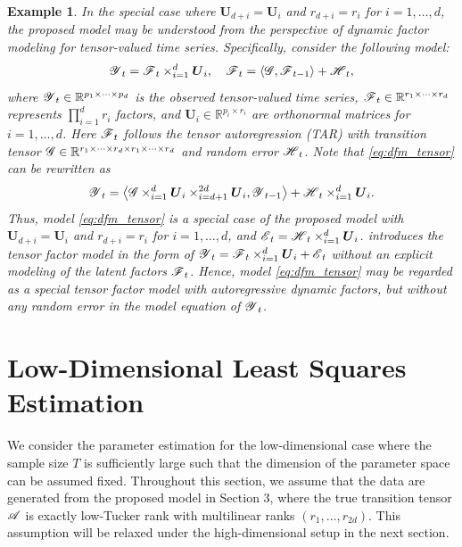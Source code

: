 \documentclass[12pt]{article}
\newtheorem{example}{Example}
\newcommand{\bm}{\boldsymbol}
\newcommand{\cm}[1]{\mbox{\boldmath$\mathscr{#1}$}}
\begin{document}
\begin{example}\label{ex2}
In the special case where $\bm{U}_{d+i}=\bm{U}_{i}$ and $r_{d+i}=r_i$ for $i=1,\dots, d$, the proposed model may be understood from the perspective of dynamic factor modeling \citep{SW11, BW16} for tensor-valued time series. Specifically, consider the following model:
\begin{equation}\label{eq:dfm_tensor}
\cm{Y}_t=\cm{F}_t\times_{i=1}^d\bm{U}_i, \quad \cm{F}_t=\langle\cm{G},\cm{F}_{t-1}\rangle+\cm{H}_t,
\end{equation}
where $\cm{Y}_t\in\mathbb{R}^{p_1\times\cdots\times p_d}$ is the observed tensor-valued time series,  $\cm{F}_t\in\mathbb{R}^{r_1\times\cdots\times r_d}$ represents $\prod_{i=1}^d r_i$ factors, and $\bm{U}_i\in\mathbb{R}^{p_i\times r_i}$ are orthonormal matrices for $i=1,\dots, d$. Here  $\cm{F}_t$ follows the tensor autoregression (TAR) with transition tensor $\cm{G}\in \mathbb{R}^{r_1\times\cdots\times r_d\times r_1\times\cdots\times r_d}$ and random error $\cm{H}_t$.
Note that \eqref{eq:dfm_tensor} can be rewritten as
\[
\cm{Y}_t =\left \langle\cm{G}\times_{i=1}^d\bm{U}_{i} \times_{i=d+1}^{2d}\bm{U}_{i},\cm{Y}_{t-1}\right \rangle+\cm{H}_t\times_{i=1}^d\bm{U}_{i}.
\]
Thus,  model \eqref{eq:dfm_tensor} is a special case of the proposed model with $\bm{U}_{d+i}=\bm{U}_{i}$ and $r_{d+i}=r_i$ for $i=1,\dots, d$, and $\cm{E}_t=\cm{H}_t\times_{i=1}^d\bm{U}_{i}$.  \citet{chen2019factor} introduces the tensor factor model in the form of $\cm{Y}_t=\cm{F}_t\times_{i=1}^d\bm{U}_i+\cm{E}_t$  without an explicit modeling of the latent factors $\cm{F}_t$. Hence, model \eqref{eq:dfm_tensor} may be regarded as a special tensor factor model with autoregressive dynamic factors, but without any random error in the model equation of $\cm{Y}_t$.
\end{example}




\section{Low-Dimensional Least Squares Estimation \label{sec:LDM}}

We consider the parameter estimation for the low-dimensional case where the sample size $T$ is sufficiently large such that the dimension of the parameter space can be assumed fixed. 
Throughout this section, we assume that the data are generated from the proposed model in Section 3, where the true transition tensor $\cm{A}$ is exactly low-Tucker rank with multilinear ranks $(r_1,\dots,r_{2d})$. This assumption will be relaxed under the high-dimensional setup in the next section.
\end{document}
